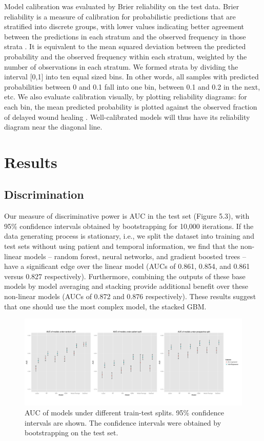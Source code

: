 Model calibration was evaluated by Brier reliability on the test data.
Brier reliability is a measure of calibration for probabilistic
predictions that are stratified into discrete groups, with lower
values indicating better agreement between the predictions in each
stratum and the observed frequency in those strata
\cite{Stephenson2008}.  It is equivalent to the mean squared deviation
between the predicted probability and the observed frequency within
each stratum, weighted by the number of observations in each stratum.
We formed strata by dividing the interval [0,1] into ten equal sized
bins.  In other words, all samples with predicted probabilities
between 0 and 0.1 fall into one bin, between 0.1 and 0.2 in the next,
etc.  We also evaluate calibration visually, by plotting reliability
diagrams: for each bin, the mean predicted probability is plotted
against the observed fraction of delayed wound healing
\cite{Degroot1982}.  Well-calibrated models will thus have its
reliability diagram near the diagonal line.

\section{Results}

\subsection{Discrimination}
Our measure of discriminative power is AUC in the test set (Figure
5.3), with 95\% confidence intervals obtained by bootstrapping for
10,000 iterations.  If the data generating process is stationary,
i.e., we split the dataset into training and test sets without using
patient and temporal information, we find that the non-linear models –
random forest, neural networks, and gradient boosted trees – have a
significant edge over the linear model (AUCs of 0.861, 0.854, and
0.861 versus 0.827 respectively).  Furthermore, combining the outputs
of these base models by model averaging and stacking provide
additional benefit over these non-linear models (AUCs of 0.872 and
0.876 respectively). These results suggest that one should use the
most complex model, the stacked GBM.

\begin{figure}
  \begin{center}
    \includegraphics[width=0.9\linewidth]{ch5-figures/discrimination.pdf}
  \end{center}
  \caption[AUC of models under different train-test splits]{AUC of
    models under different train-test splits. 95\% confidence
    intervals are shown.  The confidence intervals were obtained by
    bootstrapping on the test set.  }
  \label{fig:short}
\end{figure}

